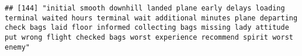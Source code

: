 \documentclass[
]{article}
\begin{document}
\begin{verbatim}
## [144] "initial smooth downhill landed plane early delays loading terminal waited hours terminal wait additional minutes plane departing check bags laid floor informed collecting bags missing lady attitude put wrong flight checked bags worst experience recommend spirit worst enemy"                                                                                                                                                                                                                                                                                                                                                                                                                                                                                                                                                                                                                                                                                                                                                                                                                                                                                                                                                                                                                                                                                                                                                                                                                                                                                                                                                                                                                                                                                                             

\end{verbatim}
\end{document}
